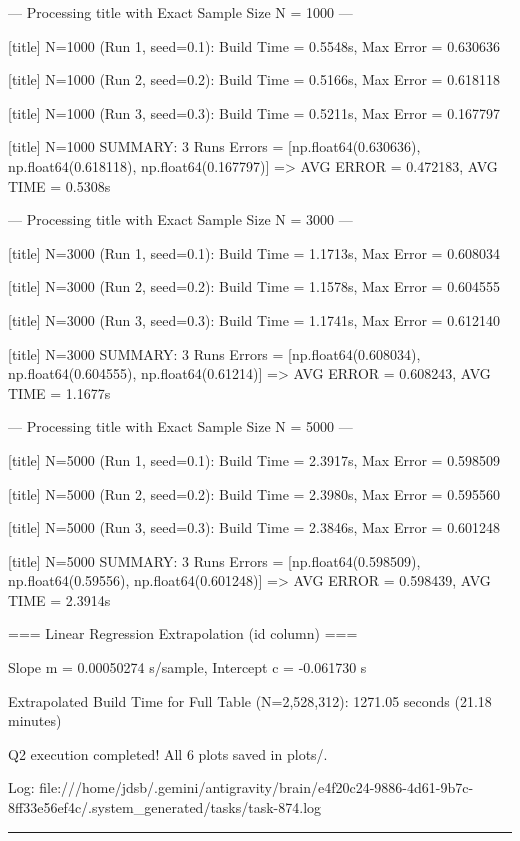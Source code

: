 \documentclass[11pt,a4paper]{article}
\begin{document}
{--- Processing title with Exact Sample Size N = 1000 ---

[title] N=1000 (Run 1, seed=0.1): Build Time = 0.5548s, Max Error = 0.630636

[title] N=1000 (Run 2, seed=0.2): Build Time = 0.5166s, Max Error = 0.618118

[title] N=1000 (Run 3, seed=0.3): Build Time = 0.5211s, Max Error = 0.167797

[title] N=1000 SUMMARY: 3 Runs Errors = [np.float64(0.630636), np.float64(0.618118), np.float64(0.167797)] => AVG ERROR = 0.472183, AVG TIME = 0.5308s


--- Processing title with Exact Sample Size N = 3000 ---

[title] N=3000 (Run 1, seed=0.1): Build Time = 1.1713s, Max Error = 0.608034

[title] N=3000 (Run 2, seed=0.2): Build Time = 1.1578s, Max Error = 0.604555

[title] N=3000 (Run 3, seed=0.3): Build Time = 1.1741s, Max Error = 0.612140

[title] N=3000 SUMMARY: 3 Runs Errors = [np.float64(0.608034), np.float64(0.604555), np.float64(0.61214)] => AVG ERROR = 0.608243, AVG TIME = 1.1677s


--- Processing title with Exact Sample Size N = 5000 ---

[title] N=5000 (Run 1, seed=0.1): Build Time = 2.3917s, Max Error = 0.598509

[title] N=5000 (Run 2, seed=0.2): Build Time = 2.3980s, Max Error = 0.595560

[title] N=5000 (Run 3, seed=0.3): Build Time = 2.3846s, Max Error = 0.601248

[title] N=5000 SUMMARY: 3 Runs Errors = [np.float64(0.598509), np.float64(0.59556), np.float64(0.601248)] => AVG ERROR = 0.598439, AVG TIME = 2.3914s


=== Linear Regression Extrapolation (id column) ===

Slope m = 0.00050274 s/sample, Intercept c = -0.061730 s

Extrapolated Build Time for Full Table (N=2,528,312): 1271.05 seconds (21.18 minutes)


Q2 execution completed! All 6 plots saved in plots/.



Log: file:///home/jdsb/.gemini/antigravity/brain/e4f20c24-9886-4d61-9b7c-8ff33e56ef4c/.system\_generated/tasks/task-874.log


\hrule

}
\end{document}
